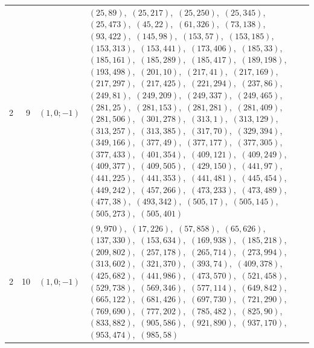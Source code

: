 \documentclass[11pt]{article}
\begin{document}
\begin{longtable}{@{}rrl>{\raggedright\arraybackslash}p{}@{}}
2 & 9 & $(1,0;-1)$ & $(25,89)$,\allowbreak\ $(25,217)$,\allowbreak\ $(25,250)$,\allowbreak\ $(25,345)$,\allowbreak\ $(25,473)$,\allowbreak\ $(45,22)$,\allowbreak\ $(61,326)$,\allowbreak\ $(73,138)$,\allowbreak\ $(93,422)$,\allowbreak\ $(145,98)$,\allowbreak\ $(153,57)$,\allowbreak\ $(153,185)$,\allowbreak\ $(153,313)$,\allowbreak\ $(153,441)$,\allowbreak\ $(173,406)$,\allowbreak\ $(185,33)$,\allowbreak\ $(185,161)$,\allowbreak\ $(185,289)$,\allowbreak\ $(185,417)$,\allowbreak\ $(189,198)$,\allowbreak\ $(193,498)$,\allowbreak\ $(201,10)$,\allowbreak\ $(217,41)$,\allowbreak\ $(217,169)$,\allowbreak\ $(217,297)$,\allowbreak\ $(217,425)$,\allowbreak\ $(221,294)$,\allowbreak\ $(237,86)$,\allowbreak\ $(249,81)$,\allowbreak\ $(249,209)$,\allowbreak\ $(249,337)$,\allowbreak\ $(249,465)$,\allowbreak\ $(281,25)$,\allowbreak\ $(281,153)$,\allowbreak\ $(281,281)$,\allowbreak\ $(281,409)$,\allowbreak\ $(281,506)$,\allowbreak\ $(301,278)$,\allowbreak\ $(313,1)$,\allowbreak\ $(313,129)$,\allowbreak\ $(313,257)$,\allowbreak\ $(313,385)$,\allowbreak\ $(317,70)$,\allowbreak\ $(329,394)$,\allowbreak\ $(349,166)$,\allowbreak\ $(377,49)$,\allowbreak\ $(377,177)$,\allowbreak\ $(377,305)$,\allowbreak\ $(377,433)$,\allowbreak\ $(401,354)$,\allowbreak\ $(409,121)$,\allowbreak\ $(409,249)$,\allowbreak\ $(409,377)$,\allowbreak\ $(409,505)$,\allowbreak\ $(429,150)$,\allowbreak\ $(441,97)$,\allowbreak\ $(441,225)$,\allowbreak\ $(441,353)$,\allowbreak\ $(441,481)$,\allowbreak\ $(445,454)$,\allowbreak\ $(449,242)$,\allowbreak\ $(457,266)$,\allowbreak\ $(473,233)$,\allowbreak\ $(473,489)$,\allowbreak\ $(477,38)$,\allowbreak\ $(493,342)$,\allowbreak\ $(505,17)$,\allowbreak\ $(505,145)$,\allowbreak\ $(505,273)$,\allowbreak\ $(505,401)$\\
2 & 10 & $(1,0;-1)$ & $(9,970)$,\allowbreak\ $(17,226)$,\allowbreak\ $(57,858)$,\allowbreak\ $(65,626)$,\allowbreak\ $(137,330)$,\allowbreak\ $(153,634)$,\allowbreak\ $(169,938)$,\allowbreak\ $(185,218)$,\allowbreak\ $(209,802)$,\allowbreak\ $(257,178)$,\allowbreak\ $(265,714)$,\allowbreak\ $(273,994)$,\allowbreak\ $(313,602)$,\allowbreak\ $(321,370)$,\allowbreak\ $(393,74)$,\allowbreak\ $(409,378)$,\allowbreak\ $(425,682)$,\allowbreak\ $(441,986)$,\allowbreak\ $(473,570)$,\allowbreak\ $(521,458)$,\allowbreak\ $(529,738)$,\allowbreak\ $(569,346)$,\allowbreak\ $(577,114)$,\allowbreak\ $(649,842)$,\allowbreak\ $(665,122)$,\allowbreak\ $(681,426)$,\allowbreak\ $(697,730)$,\allowbreak\ $(721,290)$,\allowbreak\ $(769,690)$,\allowbreak\ $(777,202)$,\allowbreak\ $(785,482)$,\allowbreak\ $(825,90)$,\allowbreak\ $(833,882)$,\allowbreak\ $(905,586)$,\allowbreak\ $(921,890)$,\allowbreak\ $(937,170)$,\allowbreak\ $(953,474)$,\allowbreak\ $(985,58)$\\

\end{longtable}
\end{document}
